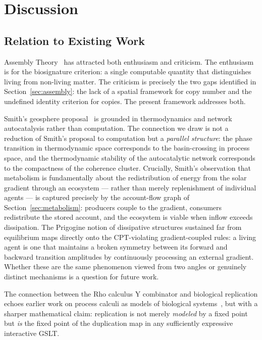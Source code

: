\chapter{Discussion}
\label{sec:origins-discussion}

\section{Relation to Existing Work}

Assembly Theory~\cite{cronin2023assembly} has attracted both
enthusiasm and criticism.
The enthusiasm is for the biosignature criterion: a single
computable quantity that distinguishes living from non-living matter.
The criticism is precisely the two gaps identified in
Section~\ref{sec:assembly}: the lack of a spatial framework for
copy number and the undefined identity criterion for copies.
The present framework addresses both.

Smith's geosphere proposal~\cite{smith2016origin} is grounded in
thermodynamics and network autocatalysis rather than computation.
The connection we draw is not a reduction of Smith's proposal to
computation but a \emph{parallel structure}: the phase transition
in thermodynamic space corresponds to the basin-crossing in
process space, and the thermodynamic stability of the autocatalytic
network corresponds to the compactness of the coherence cluster.
Crucially, Smith's observation that metabolism is fundamentally
about the redistribution of energy from the solar gradient through
an ecosystem --- rather than merely replenishment of individual
agents --- is captured precisely by the account-flow graph of
Section~\ref{sec:metabolism}: producers couple to the gradient,
consumers redistribute the stored account, and the ecosystem is
viable when inflow exceeds dissipation.
The Prigogine notion of dissipative structures sustained far from
equilibrium maps directly onto the CPT-violating gradient-coupled
rules: a living agent is one that maintains a broken symmetry
between its forward and backward transition amplitudes by
continuously processing an external gradient.
Whether these are the same phenomenon viewed from two angles or
genuinely distinct mechanisms is a question for future work.

The connection between the Rho calculus Y combinator and
biological replication echoes earlier work on process calculi
as models of biological systems~\cite{regev2001representation},
but with a sharper mathematical claim: replication is not merely
\emph{modeled} by a fixed point but \emph{is} the fixed point
of the duplication map in any sufficiently expressive interactive
GSLT.

